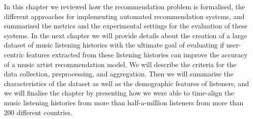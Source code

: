 In this chapter we reviewed how the recommendation problem is formalised, the different approaches for implementing automated recommendation systems, and summarised the metrics and the experimental settings for the evaluation of these systems.
In the next chapter we will provide details about the creation of a large dataset of music listening histories with the ultimate goal of evaluating if user-centric features extracted from these listening histories can improve the accuracy of a music artist recommendation model.
We will describe the criteria for the data collection, preprocessing, and aggregation. Then we will summarise the characteristics of the dataset as well as the demographic features of listeners, and we will finalise the chapter by presenting how we were able to time-align the music listening histories from more than half-a-million listeners from more than 200 different countries.



















